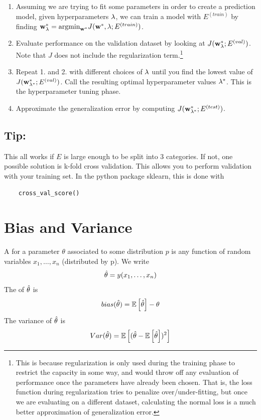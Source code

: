 \begin{enumerate}
    \item Assuming we are trying to fit some parameters in order to create a prediction model, given hyperparameters $\vlambda$, we can train a model with $E^{{(train)}}$ by finding $\vw^{*}_{\vlambda} = \argmin_{\vw^{*}} J (\vw^{*}, \vlambda; E^{{(train)}})$.
    \item Evaluate performance on the validation dataset by looking at $J(\vw_{\vlambda}^{*} ; E^{{(val)}})$. Note that $J$ does not include the regularization term.\footnote{This is because regularization is only used during the training phase to restrict the capacity in some way, and would throw off any evaluation of performance once the parameters have already been chosen. That is, the loss function during regularization tries to penalize over/under-fitting, but once we are evaluating on a different dataset, calculating the normal loss is a much better approximation of generalization error. }
    \item Repeat 1. and 2. with different choices of $\vlambda$ until you find the lowest value of $J(\vw_{\vlambda^{*}}^{*} ; E^{{(val)}})$. Call the resulting optimal hyperparameter values $\vlambda^{*}$. This is the hyperparameter tuning phase.
    \item Approximate the generalization error by computing $J(\vw_{\vlambda^{*}}^{*} ; E^{{(test)}})$.
\end{enumerate}

\subsection{Tip:}
This all works if $E$ is large enough to be split into 3 categories. If not, one possible solution is k-fold cross validation. This allows you to perform validation with your training set. In the python package sklearn, this is done with 
\begin{verbatim}
    cross_val_score()
\end{verbatim}

\section{Bias and Variance}

\begin{definition}
    A  for a parameter $\theta$ associated to some distribution $p$ is any function of random variables $x_{1}, \ldots, x_{n}$ (distributed by p). We write
    \[\thetahat = y(x_{1}, \ldots, x_{n} ) \]
    The  of $\thetahat$ is
    \[bias(\thetahat) = \Ev\left[\thetahat\right] - \theta\]
    The variance of $\thetahat$ is 
    \[Var(\thetahat) = \Ev \left[(\thetahat - \Ev \left[ \thetahat \right])^{2} \right] \]
\end{definition}

